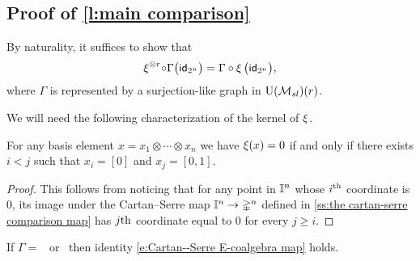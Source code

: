 \subsection{Proof of \cref{l:main comparison}} \label{ss:comparison proof}

By naturality, it suffices to show that
\begin{equation} \label{e:Cartan--Serre E-coalgebra map}
\operatorname{\xi}^{\otimes r} \! \circ \Gamma \big( \mathsf{id}_{2^n} \big) = \Gamma \circ \operatorname{\xi} \big( \mathsf{id}_{2^n} \big),
\end{equation}
where $\Gamma$ is represented by a surjection-like graph in ${\operatorname{U}(\mathcal{M}_{sl})}(r)$.

We will need the following characterization of the kernel of $\operatorname{\xi}$.
\begin{lemma} \label{l:kernel of psi}
	For any basis element $x = x_1 \otimes \cdots \otimes x_n$ we have $\operatorname{\xi}(x) = 0$ if and only if there exists $i < j$ such that $x_i = [0]$ and $x_j = [0,1]$.
\end{lemma}

\begin{proof}
	This follows from noticing that for any point in $\mathbb{I}^n$ whose $i^{\mathrm{th}}$ coordinate is $0$, its image under the Cartan--Serre map $\mathbb{I}^n \to \mathbb{\Delta}^n$ defined in \cref{ss:the cartan-serre comparison map} has $j\mathrm{th}$ coordinate equal to $0$ for every $j \geq i$.
\end{proof}

\begin{lemma}
	If $\Gamma =$ \counit \ or \coproduct \ then identity \eqref{e:Cartan--Serre E-coalgebra map} holds.
\end{lemma}

